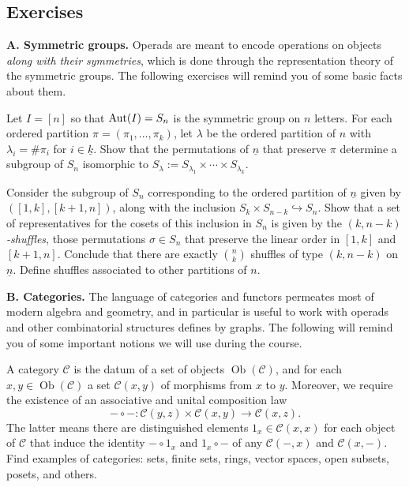 \newpage

\subsection{Exercises}
 
\textbf{A. Symmetric groups.} Operads are meant to encode
operations on objects \emph{along with their symmetries},
which is done through the representation theory of the
symmetric groups. The following exercises will remind
you of some basic facts about them.


\begin{question} Let $I = [n]$ so that $\operatorname{Aut}(I) = S_n$ is 
the symmetric group on $n$ letters. For each ordered 
partition $\pi = (\pi_1,\ldots,\pi_k)$, let $\lambda$
be the ordered partition of $n$ with $\lambda_i = \# \pi_i$
for $i\in \underline{k}$. Show that the permutations of
$\underline{n}$ that preserve $\pi$ determine a subgroup of $S_n$
isomorphic to $S_\lambda := S_{\lambda_1}\times
\cdots \times S_{\lambda_k}$. 
\end{question}


\begin{question} Consider the subgroup of $S_n$ corresponding
to the ordered partition of $\underline{n}$ given by $([1,k],[k+1,n])$, along with the 
inclusion $S_k\times S_{n-k} \hookrightarrow S_n$. Show that
a set of representatives for the cosets of this inclusion
in $S_n$ is given by the \emph{$(k,n-k)$-shuffles}, those
permutations $\sigma\in S_n$ that preserve the linear order in
$[1,k]$ and $[k+1,n]$. Conclude that there are exactly
$\binom nk$ shuffles of type $(k,n-k)$ on $\underline{n}$. Define
shuffles associated to other partitions of $n$.
\end{question}

\medskip
\textbf{B. Categories.} The language of categories and
functors permeates most of modern algebra and geometry,
and in particular is useful to work with operads and
other combinatorial structures defines by graphs. The
following will remind you of some important notions
we will use during the course.

\begin{question} A category $\mathcal C$ is the datum of
a set of objects $\operatorname{Ob}(\mathcal{C})$, and
for each $x,y\in \operatorname{Ob}(\mathcal{C})$ a
set $\mathcal C(x,y)$ of morphisms from $x$ to $y$.
Moreover, we require the existence of an associative
and unital composition law
\[-\circ -: \mathcal C(y,z) \times  \mathcal C(x,y) 
	\longrightarrow \mathcal C(x,z). \] 
	The latter means there are distinguished elements
	$1_x\in \mathcal{C}(x,x)$ for each object of $\mathcal{C}$
	that induce the identity $-\circ 1_x$ and $1_x\circ -$
	of any $\mathcal{C}(-,x)$ and $\mathcal{C}(x,-)$.
	Find examples of categories: sets, finite sets,
	rings, vector spaces, open subsets, posets, and 
	others.
\end{question}

